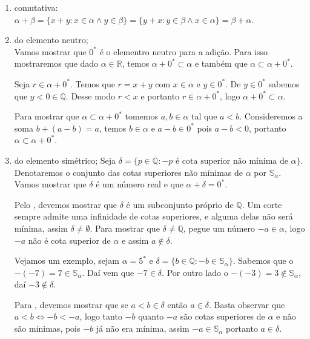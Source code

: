 \documentclass[../main.tex]{subfiles}
\begin{document}
\begin{dem}
\begin{enumerate}[label=(\roman*)]
        \item comutativa: \\
            $\alpha + \beta = \{ x+y : x \in \alpha \land y \in \beta \} = \{ y+x: y \in \beta \land x \in \alpha \} = \beta + \alpha$.
            
        \item do elemento neutro; \\
            Vamos mostrar que $0^*$ é o elementro neutro para a adição. Para isso mostraremos que dado $\alpha \in \mathbb{R}$, temos $\alpha + 0^* \subset \alpha$ e também que $\alpha \subset \alpha + 0^*$.

            Seja $r \in \alpha + 0^*$. Temos que $r = x+y$ com $x \in \alpha$ e $y \in 0^*$. De $y \in 0^*$ sabemos que $y < 0 \in \mathbb{Q}$. Desse modo $r < x$ e portanto $r \in \alpha + 0^*$, logo $\alpha + 0^* \subset \alpha$.

            Para mostrar que $\alpha \subset \alpha + 0^*$ tomemos $a, b \in \alpha$ tal que $a < b$. Consideremos a soma $b + (a - b) = a$, temos $b \in \alpha$ e $a-b \in 0^*$ pois $a-b < 0$, portanto $\alpha \subset \alpha + 0^*$.
        \item do elemento simétrico;
            Seja $\delta = \{ p \in \mathbb{Q} : -p \text{ é cota superior não mínima de } \alpha \}$. Denotaremos o conjunto das cotas superiores não mínimas de $\alpha$ por $\mathbb{S}_{\alpha}$.
            Vamos mostrar que $\delta$ é um número real e que $\alpha + \delta = 0^*$.

            Pelo , devemos mostrar que $\delta$ é um subconjunto próprio de $\mathbb{Q}$. Um corte sempre admite uma infinidade de cotas superiores, e alguma delas não será mínima, assim $\delta \neq \emptyset$. Para mostrar que $\delta \neq \mathbb{Q}$, pegue um número $-a \in \alpha$, logo $-a$ não é cota superior de $\alpha$ e assim $a \not\in \delta$.

            Vejamos um exemplo, sejam $\alpha = 5^*$ e $\delta = \{ b \in  \mathbb{Q} : -b \in \mathbb{S}_{\alpha} \}$.
            Sabemos que o $-(-7) = 7 \in \mathbb{S}_{\alpha}$. Daí vem que $-7 \in \delta$. Por outro lado o $-(-3) = 3 \not\in \mathbb{S}_{\alpha}$, daí $-3 \not\in \delta$.

            Para , devemos mostrar que se $a < b \in \delta$ então $a \in \delta$. Basta observar que $a < b \iff -b < -a$, logo tanto $-b$ quanto $-a$ são cotas superiores de $\alpha$ e não são mínimas, pois $-b$ já não era mínima, assim $-a \in \mathbb{S}_{\alpha}$ portanto $a \in \delta$.


\end{enumerate}
\end{dem}
\end{document}
